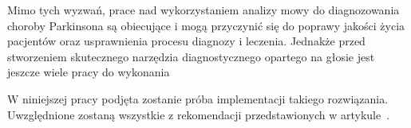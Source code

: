 Mimo tych wyzwań, prace nad wykorzystaniem analizy mowy do diagnozowania choroby Parkinsona są obiecujące i mogą przyczynić się do poprawy jakości życia
pacjentów oraz usprawnienia procesu diagnozy i leczenia.
Jednakże przed stworzeniem skutecznego narzędzia diagnostycznego opartego na głosie jest jeszcze wiele pracy do wykonania

W niniejszej pracy podjęta zostanie próba implementacji takiego rozwiązania.
Uwzględnione zostaną wszystkie z rekomendacji przedstawionych w artykule~\cite{SustainedVowelsProblems}.